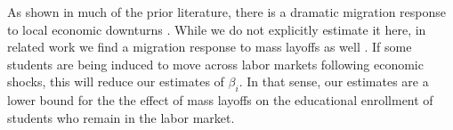 As shown in much of the prior literature, there is a dramatic migration response to local economic downturns \citep{blanchard1992regional}. While we do not explicitly estimate it here, in related work we find a migration response to mass layoffs as well \citep{FGS2015}. If some students are being induced to move across labor markets following economic shocks, this will reduce our estimates of $\beta_i$. In that sense, our estimates are a lower bound for the the effect of mass layoffs on the educational enrollment of students who remain in the labor market. 